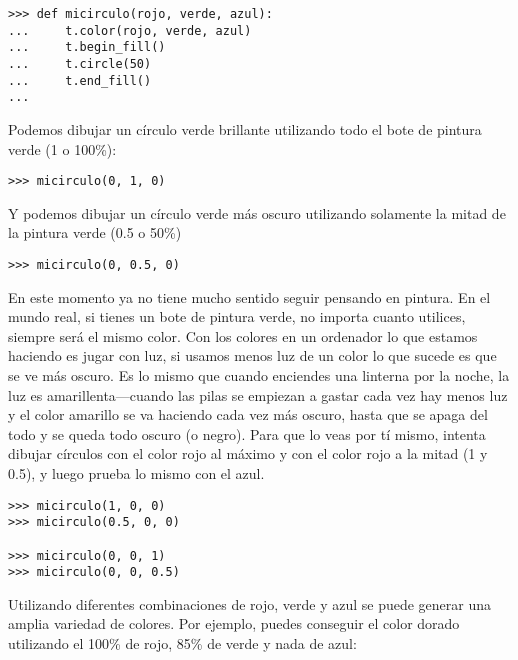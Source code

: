 \begin{listing}
\begin{verbatim}
>>> def micirculo(rojo, verde, azul):
...     t.color(rojo, verde, azul)
...     t.begin_fill()
...     t.circle(50)
...     t.end_fill()
...
\end{verbatim}
\end{listing}

\noindent
Podemos dibujar un círculo verde brillante utilizando todo el bote de pintura verde (1 o 100\%):

\begin{listing}
\begin{verbatim}
>>> micirculo(0, 1, 0)
\end{verbatim}
\end{listing}

\noindent
Y podemos dibujar un círculo verde más oscuro utilizando solamente la mitad de la pintura verde (0.5 o 50\%)

\begin{listing}
\begin{verbatim}
>>> micirculo(0, 0.5, 0)
\end{verbatim}
\end{listing}

En este momento ya no tiene mucho sentido seguir pensando en pintura. En el mundo real, si tienes un bote de pintura verde, no importa cuanto utilices, siempre será el mismo color.  Con los colores en un ordenador lo que estamos haciendo es jugar con luz, si usamos menos luz de un color lo que sucede es que se ve más oscuro.  Es lo mismo que cuando enciendes una linterna por la noche, la luz es amarillenta---cuando las pilas se empiezan a gastar cada vez hay menos luz y el color amarillo se va haciendo cada vez más oscuro, hasta que se apaga del todo y se queda todo oscuro (o negro).  Para que lo veas por tí mismo, intenta dibujar círculos con el color rojo al máximo y con el color rojo a la mitad (1 y 0.5), y luego prueba lo mismo con el azul.

\begin{listing}
\begin{verbatim}
>>> micirculo(1, 0, 0)
>>> micirculo(0.5, 0, 0)

>>> micirculo(0, 0, 1)
>>> micirculo(0, 0, 0.5)
\end{verbatim}
\end{listing}

\noindent
Utilizando diferentes combinaciones de rojo, verde y azul se puede generar una amplia variedad de colores.  Por ejemplo, puedes conseguir el color dorado utilizando el 100\% de rojo, 85\% de verde y nada de azul:

